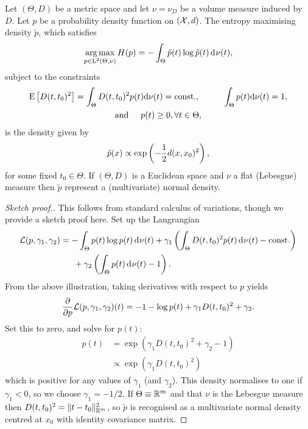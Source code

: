 \begin{lemma}\label{thm:maxentr}
  Let $(\Theta,D)$ be a metric space and let $\nu=\nu_D$ be a volume measure induced by $D$.
  Let $p$ be a probability density function on $({\mathcal X},d)$.
  The entropy maximising density $\tilde p$, which satisfies
  \[
    \operatorname*{arg\,max}_{p\in\text{L}^2(\Theta,\nu)} H(p) = - \int_\Theta \tilde p(t) \log \tilde p(t) \operatorname{d}\hspace{0.5pt}\!\nu(t),
  \]
  subject to the constraints
  \begin{align*}
    \begin{gathered}
      \operatorname{E}\big[D(t,t_0)^2\big] = \int_\Theta D(t,t_0)^2 p(t) \text{d}\nu(t) = \text{const.}, \hspace{1cm} 
      \int_\Theta p(t) \text{d}\nu(t) = 1, \\
      \text{and} \hspace{0.5cm} p(t) \geq 0, \forall t \in \Theta,
    \end{gathered}
  \end{align*}
  is the density given by
  \[
    \tilde p(x) \propto \exp \left(-\frac{1}{2} d(x,x_0)^2 \right),
  \]
  for some fixed $t_0\in\Theta$.
  If $(\Theta,D)$ is a Euclidean space and $\nu$ a flat (Lebesgue) measure then $\tilde p$ represent a (multivariate) normal density.
\end{lemma}

\begin{proof}[Sketch proof.]
  This follows from standard calculus of variations, though we provide a sketch proof here.
  Set up the Langrangian
  \begin{align*}
      {\mathcal L}(p,\gamma_1,\gamma_2) &= 
      - \int_\Theta p(t) \log p(t) \operatorname{d}\hspace{0.5pt}\!\nu(t) +
      \gamma_1 \left(\int_\Theta D(t,t_0)^2 p(t) \operatorname{d}\hspace{0.5pt}\!\nu(t) - \text{const.} \right) \\
      &\phantom{==} + \gamma_2 \left( \int_\Theta p(t) \operatorname{d}\hspace{0.5pt}\!\nu(t) - 1 \right).
  \end{align*}
  From the above illustration, taking derivatives with respect to $p$ yields
  \begin{align*}
    \frac{\partial}{\partial p} {\mathcal L}(p,\gamma_1,\gamma_2)(t)
    = - 1 - \log p(t) + \gamma_1 D(t,t_0)^2 + \gamma_2.
  \end{align*}
  Set this to zero, and solve for $p(t)$:
  \begin{align*}
    p(t) &= \exp \left( \gamma_1 D(t,t_0)^2 + \gamma_2 - 1 \right) \\
    &\propto \exp \left( \gamma_1 D(t,t_0)^2 \right)
  \end{align*}
  which is positive for any values of $\gamma_1$ (and $\gamma_2$).
  This density normalises to one if $\gamma_1 < 0$, so we choose $\gamma_1=-1/2$.
  If $\Theta \equiv \mathbb{R}^m$ and that $\nu$ is the Lebesgue measure then $D(t,t_0)^2 = \lVert t-t_0\rVert_{\mathbb{R}^m}^2$, so $\tilde p$ is recognised as a multivariate normal density centred at $x_0$ with identity covariance matrix.
\end{proof}

